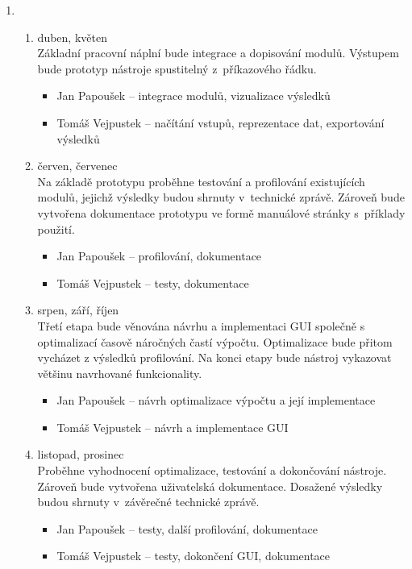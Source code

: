 \documentclass[a4paper]{article}
\begin{document}
\begin{enumerate}
\item\begin{enumerate}
	\item duben, květen\\
		Základní pracovní náplní bude integrace a dopisování modulů. Výstupem bude
        prototyp nástroje spustitelný z~příkazového řádku.
        \begin{itemize}
            \item   Jan Papoušek -- integrace modulů, vizualizace výsledků
            \item   Tomáš Vejpustek -- načítání vstupů, reprezentace dat, exportování výsledků
        \end{itemize}
	\item červen, červenec\\
		Na základě prototypu proběhne testování a profilování existujících modulů,
        jejichž výsledky budou shrnuty v~technické zprávě.
		Zároveň bude vytvořena dokumentace prototypu ve formě manuálové stránky
        s~příklady použití.
        \begin{itemize}
            \item   Jan Papoušek -- profilování, dokumentace
            \item   Tomáš Vejpustek -- testy, dokumentace
        \end{itemize}
	\item srpen, září, říjen\\
		Třetí etapa bude věnována návrhu a implementaci GUI společně s optimalizací časově
        náročných častí výpočtu. Optimalizace bude přitom vycházet z výsledků profilování.
        Na konci etapy bude nástroj vykazovat většinu navrhované funkcionality.
        \begin{itemize}
            \item   Jan Papoušek -- návrh optimalizace výpočtu a její implementace
            \item   Tomáš Vejpustek -- návrh a implementace GUI
        \end{itemize}
	\item listopad, prosinec\\
		Proběhne vyhodnocení optimalizace, testování a dokončování nástroje.
        Zároveň bude vytvořena uživatelská dokumentace. Dosažené výsledky budou
        shrnuty v~závěrečné technické zprávě.
        \begin{itemize}
            \item   Jan Papoušek -- testy, další profilování, dokumentace
            \item   Tomáš Vejpustek -- testy, dokončení GUI, dokumentace
        \end{itemize}
	\end{enumerate}
\end{enumerate}



\end{document}
